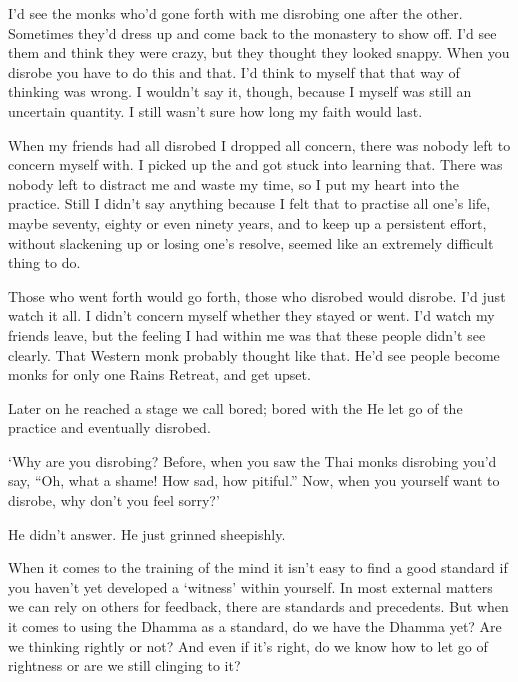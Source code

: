 I'd see the monks who'd gone forth with me disrobing one after the other. Sometimes they'd dress up and come back to the monastery to show off. I'd see them and think they were crazy, but they thought they looked snappy. When you disrobe you have to do this and that. I'd think to myself that that way of thinking was wrong. I wouldn't say it, though, because I myself was still an uncertain quantity. I still wasn't sure how long my faith would last.

When my friends had all disrobed I dropped all concern, there was nobody left to concern myself with. I picked up the  and got stuck into learning that. There was nobody left to distract me and waste my time, so I put my heart into the practice. Still I didn't say anything because I felt that to practise all one's life, maybe seventy, eighty or even ninety years, and to keep up a persistent effort, without slackening up or losing one's resolve, seemed like an extremely difficult thing to do.

Those who went forth would go forth, those who disrobed would disrobe. I'd just watch it all. I didn't concern myself whether they stayed or went. I'd watch my friends leave, but the feeling I had within me was that these people didn't see clearly. That Western monk probably thought like that. He'd see people become monks for only one Rains Retreat, and get upset.

Later on he reached a stage we call bored; bored with the  He let go of the practice and eventually disrobed.

`Why are you disrobing? Before, when you saw the Thai monks disrobing you'd say, ``Oh, what a shame! How sad, how pitiful.'' Now, when you yourself want to disrobe, why don't you feel sorry?'

He didn't answer. He just grinned sheepishly.

When it comes to the training of the mind it isn't easy to find a good standard if you haven't yet developed a `witness' within yourself. In most external matters we can rely on others for feedback, there are standards and precedents. But when it comes to using the Dhamma as a standard, do we have the Dhamma yet? Are we thinking rightly or not? And even if it's right, do we know how to let go of rightness or are we still clinging to it?

